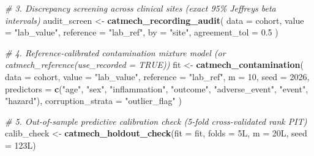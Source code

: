 \documentclass[
]{article}
\newenvironment{Shaded}{\begin{snugshade}}{\end{snugshade}}
\newcommand{\AttributeTok}[1]{\textcolor[rgb]{0.13,0.29,0.53}{#1}}
\newcommand{\CommentTok}[1]{\textcolor[rgb]{0.56,0.35,0.01}{\textit{#1}}}
\newcommand{\DataTypeTok}[1]{\textcolor[rgb]{0.13,0.29,0.53}{#1}}
\newcommand{\DecValTok}[1]{\textcolor[rgb]{0.00,0.00,0.81}{#1}}
\newcommand{\FloatTok}[1]{\textcolor[rgb]{0.00,0.00,0.81}{#1}}
\newcommand{\FunctionTok}[1]{\textcolor[rgb]{0.13,0.29,0.53}{\textbf{#1}}}
\newcommand{\NormalTok}[1]{#1}
\newcommand{\OtherTok}[1]{\textcolor[rgb]{0.56,0.35,0.01}{#1}}
\newcommand{\StringTok}[1]{\textcolor[rgb]{0.31,0.60,0.02}{#1}}
\begin{document}
\begin{Shaded}
\begin{Highlighting}[]
\CommentTok{\# 3. Discrepancy screening across clinical sites (exact 95\% Jeffreys beta intervals)}
\NormalTok{audit\_screen }\OtherTok{\textless{}{-}} \FunctionTok{catmech\_recording\_audit}\NormalTok{(}
  \AttributeTok{data =}\NormalTok{ cohort, }\AttributeTok{value =} \StringTok{"lab\_value"}\NormalTok{, }\AttributeTok{reference =} \StringTok{"lab\_ref"}\NormalTok{,}
  \AttributeTok{by =} \StringTok{"site"}\NormalTok{, }\AttributeTok{agreement\_tol =} \FloatTok{0.5}
\NormalTok{)}

\CommentTok{\# 4. Reference{-}calibrated contamination mixture model (or catmech\_reference(use\_recorded = TRUE))}
\NormalTok{fit }\OtherTok{\textless{}{-}} \FunctionTok{catmech\_contamination}\NormalTok{(}
  \AttributeTok{data =}\NormalTok{ cohort, }\AttributeTok{value =} \StringTok{"lab\_value"}\NormalTok{, }\AttributeTok{reference =} \StringTok{"lab\_ref"}\NormalTok{, }\AttributeTok{m =} \DecValTok{10}\NormalTok{, }\AttributeTok{seed =} \DecValTok{2026}\NormalTok{,}
  \AttributeTok{predictors =} \FunctionTok{c}\NormalTok{(}\StringTok{"age"}\NormalTok{, }\StringTok{"sex"}\NormalTok{, }\StringTok{"inflammation"}\NormalTok{, }\StringTok{"outcome"}\NormalTok{, }\StringTok{"adverse\_event"}\NormalTok{, }\StringTok{"event"}\NormalTok{,}
                 \StringTok{"hazard"}\NormalTok{), }\AttributeTok{corruption\_strata =} \StringTok{"outlier\_flag"}
\NormalTok{)}

\CommentTok{\# 5. Out{-}of{-}sample predictive calibration check (5{-}fold cross{-}validated rank PIT)}
\NormalTok{calib\_check }\OtherTok{\textless{}{-}} \FunctionTok{catmech\_holdout\_check}\NormalTok{(}\AttributeTok{fit =}\NormalTok{ fit, }\AttributeTok{folds =} \DecValTok{5}\DataTypeTok{L}\NormalTok{, }\AttributeTok{m =} \DecValTok{20}\DataTypeTok{L}\NormalTok{, }\AttributeTok{seed =} \DecValTok{123}\DataTypeTok{L}\NormalTok{)}


\end{Highlighting}
\end{Shaded}
\end{document}
